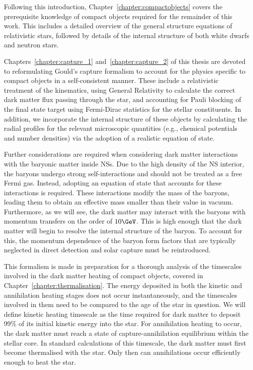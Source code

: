 Following this introduction, Chapter~\ref{chapter:compactobjects} covers the prerequisite knowledge of compact objects
required for the remainder of this work. This includes a detailed overview of the general structure equations of relativistic stars, followed by details of the internal structure of both white dwarfs and neutron stars. 

Chapters~\ref{chapter:capture_1} and~\ref{chapter:capture_2} of this thesis are devoted to reformulating Gould's capture formalism to account for the physics specific to compact objects in a self-consistent manner. These include a relativistic treatment of the kinematics, using General Relativity to calculate the correct dark matter flux passing through the star, and accounting for Pauli blocking of the final state target using Fermi-Dirac statistics for the stellar constituents. In addition, we incorporate the internal structure of these objects by calculating the radial profiles for the relevant microscopic quantities (e.g., chemical potentials and number densities) via the adoption of a realistic equation of state.

Further considerations are required when considering dark matter interactions with the baryonic matter inside NSs. Due to the high density of the NS interior, the baryons undergo strong self-interactions and should not be treated as a free Fermi gas. Instead, adopting an equation of state that accounts for these interactions is required. These interactions modify the mass of the baryons, leading them to obtain an effective mass smaller than their value in vacuum. Furthermore, as we will see, the dark matter may interact with the baryons with momentum transfers on the order of $10\GeV$. This is high enough that the dark matter will begin to resolve the internal structure of the baryon. To account for this, the momentum dependence of the baryon form factors that are typically neglected in direct detection and solar capture must be reintroduced.

This formalism is made in preparation for a thorough analysis of the timescales involved in the dark matter heating of compact objects, covered in Chapter~\ref{chapter:thermalisation}. The energy deposited in both the kinetic and annihilation heating stages does not occur instantaneously, and the timescales involved in them need to be compared to the age of the star in question. We will define kinetic heating timescale as the time required for dark matter to deposit 99\% of its initial kinetic energy into the star. For annihilation heating to occur, the dark matter must reach a state of capture-annihilation equilibrium within the stellar core. In standard calculations of this timescale, the dark matter must first become thermalised with the star. Only then can annihilations occur efficiently enough to heat the star. 


